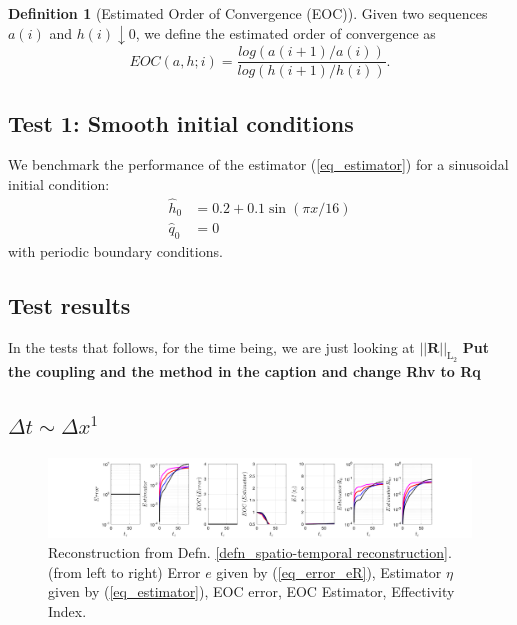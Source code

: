 \documentclass[12pt,a4paper]{article}
\numberwithin{equation}{section}
\theoremstyle{definition}
\newcommand{\Norm}[1]{\left|\left|#1\right|\right|}
\newcommand{\vect}[1]{\textbf{#1}}
\newcommand{\leb}{\text{L}}
\newcommand{\qp}[1]{\left(#1\right)}
\newtheorem{Defn}[subsection]{Definition}
\begin{document}
\begin{Defn}[Estimated Order of Convergence (EOC)] Given two sequences $a\qp{i}$ and $h\qp{i}\downarrow 0$, we define the estimated order of convergence as
\begin{equation}
EOC\qp{a,h;i} = \frac{log\qp{a\qp{i+1}/a\qp{i}}}{log\qp{h\qp{i+1}/h\qp{i}}}.
\end{equation}
\end{Defn}

\subsection{Test 1: Smooth initial conditions}  We benchmark the performance of the estimator (\ref{eq_estimator}) for a sinusoidal initial condition:
\begin{equation}
\begin{aligned}
\widehat{h}_0&=	0.2+0.1\sin\qp{\pi x /16}\\
\widehat{q}_0&=0
\end{aligned}
\end{equation}
with periodic boundary conditions. 
\subsection{Test results}\label{sec:num_exp}
In the tests that follows, for the time being, we are just looking at $\Norm{\vect{R}}_{\leb_2}$ \textbf{Put the coupling and the method in the caption and change Rhv to Rq}
\subsection*{$\Delta t \sim \Delta x^1$}
\begin{figure}[H]
	\hspace{-3cm}
	\includegraphics[scale=0.55]{../figures/fig_SHW_RK1_LXF_rec1_pow_oneplots_1x5_shw_periodic}	
	\caption{Reconstruction from Defn. \ref{defn_spatio-temporal reconstruction}. (from left to right) Error $e$ given by (\ref{eq_error_eR}), Estimator $\eta$ given by (\ref{eq_estimator}), EOC error, EOC Estimator, Effectivity Index.}
	\label{fig_all_RK1_LXF_rec1_pow_one}
\end{figure}
\end{document}
